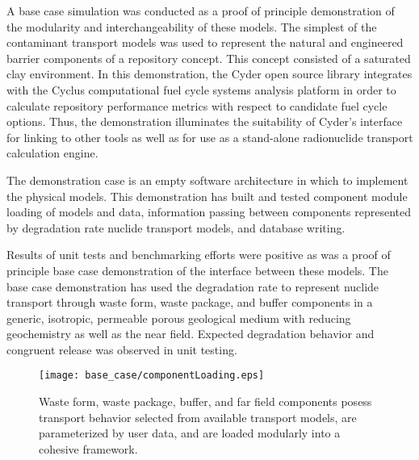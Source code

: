 
A base case simulation was conducted as a proof of principle demonstration of 
the modularity and interchangeability of these models. The simplest of the 
contaminant transport models was used to represent the natural and engineered 
barrier components of a repository concept. This concept consisted of a  
saturated clay environment.  In this demonstration, the Cyder open source 
library integrates with the Cyclus computational fuel cycle systems analysis 
platform in order to calculate repository performance metrics with respect to 
candidate fuel cycle options.  Thus, the demonstration illuminates the 
suitability of Cyder's interface for linking to other tools as well as for use 
as a stand-alone radionuclide transport calculation engine.

The demonstration case is an empty software architecture in which to implement 
the physical models. This demonstration has built and tested component module 
loading of models and data, information passing between components represented by 
degradation rate nuclide transport models, and database writing.

Results of unit tests and benchmarking efforts were positive as was a proof of 
principle base case demonstration of the interface between these models. The 
base case demonstration has used the degradation rate to represent nuclide 
transport through waste form, waste package, and buffer components in a generic, 
isotropic, permeable porous geological medium with reducing geochemistry as well 
as the near field. Expected degradation behavior and congruent release was 
observed in unit testing.  

  \begin{figure}[htbp!]
    \begin{center}
      \texttt{[image: base\_case/componentLoading.eps]}
      \caption{Waste form, waste package, buffer, and far field components 
        posess transport behavior selected from available transport 
        models, are parameterized by user data, and are loaded modularly 
      into a cohesive framework.}
    \end{center}
  \end{figure}

  
